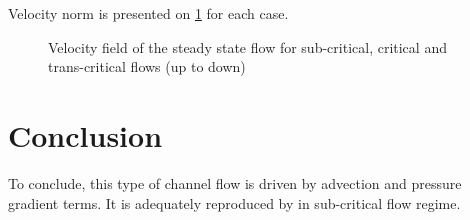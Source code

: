 Velocity norm is presented on \ref{fig:bumpsub:fig:u} for each case.

\begin{figure}[H]
\begin{minipage}[t]{\textwidth}
 \centering
\end{minipage}
\begin{minipage}[t]{\textwidth}
 \centering
\end{minipage}
\begin{minipage}[t]{\textwidth}
 \centering
\end{minipage}
  \caption{Velocity field of the steady state flow for sub-critical, critical and trans-critical flows (up to down)}\label{fig:bumpsub:fig:u}
\end{figure}

\section{Conclusion}

To conclude, this type of channel flow is driven by advection
and pressure gradient terms. It is adequately reproduced by
 in sub-critical flow regime.



